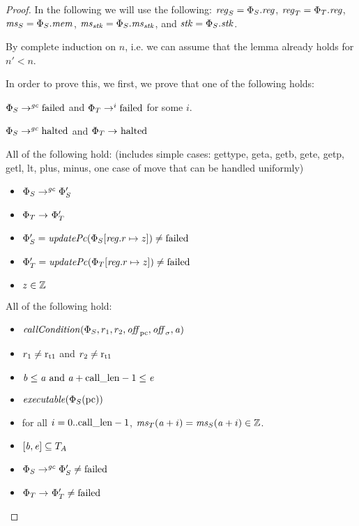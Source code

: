 \begin{proof}
  In the following we will use the following: $\reg_S = \Phi_S.\reg$, $\reg_T = \Phi_T.\reg$, $\ms_S = \Phi_S.\mem$, $\ms_\stk = \Phi_S.\ms_\stk$, and $\stk = \Phi_S.\stk$.

  By complete induction on $n$, i.e. we can assume that the lemma already holds for $n' < n$.

  In order to prove this, we first, we prove that one of the following holds:
  \begin{enumproof}
  \item \label{case:ftlr:failed} $\Phi_S \step[\gc] \failed$ and $\Phi_T
    \step[i] \failed$ for some $i$.
  \item \label{case:ftlr:halted} $\Phi_S \step[\gc] \halted$ and $\Phi_T \step\halted$
  \item \label{case:ftlr:get-and-arith-op} All of the following hold: (includes simple cases: gettype, geta, getb,
    gete, getp, getl, lt, plus, minus, one case of move that can be handled
    uniformly)
    \begin{itemize}
    \item $\Phi_S \step[\gc] \Phi_S'$
    \item $\Phi_T \step \Phi_T'$
    \item $\Phi_S' = \updPcAddr{\Phi_S\updReg{r}{z}} \neq \failed$
    \item $\Phi_T' = \updPcAddr{\Phi_T\updReg{r}{z}} \neq \failed$
    \item $z \in \ints$
    \end{itemize}
  \item \label{case:ftlr:call} All of the following hold:
    \begin{itemize}
    \item $\callCond{\Phi_S,r_1,r_2,\offpc,\offsigma,\aaddr}$
    \item $r_1 \neq \rtmp{1}$ and $r_2 \neq \rtmp{1}$
    \item $\baddr \leq \aaddr \tand \aaddr + \calllen-1 \leq \eaddr$
    \item $\exec{\Phi_S(\pcreg)}$
    \item for all $i = 0..\calllen-1$, $\ms_T(\aaddr+i) = \ms_S(\aaddr+i) \in \ints$.
    \item $[\baddr,\eaddr] \subseteq \ta$
    \item $\Phi_S \step[\gc] \Phi_S' \neq \failed$
    \item $\Phi_T \step \Phi_T' \neq \failed$

\end{itemize}
\end{enumproof}
\end{proof}

